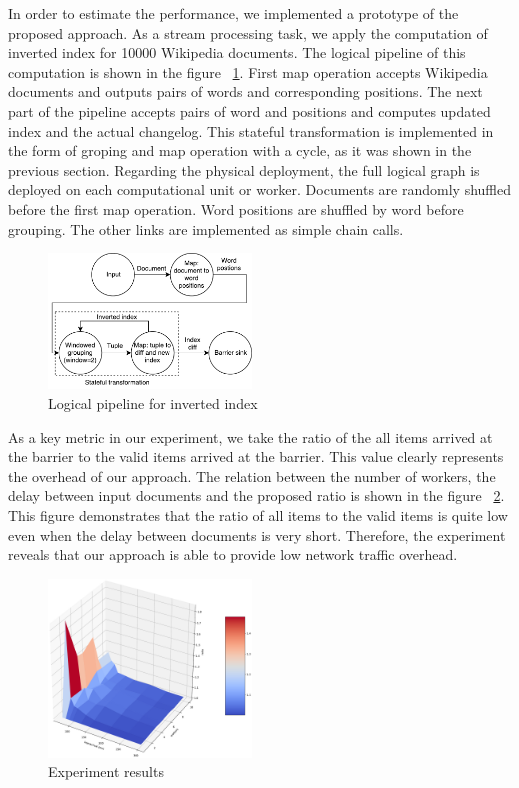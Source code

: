 
\label {fs-experiments}

In order to estimate the performance, we implemented a prototype of the proposed approach. As a stream processing task, we apply the computation of inverted index for 10000 Wikipedia documents. The logical pipeline of this computation is shown in the figure ~\ref{inverted-index}. First map operation accepts Wikipedia documents and outputs pairs of words and corresponding positions. The next part of the pipeline accepts pairs of word and positions and computes updated index and the actual changelog. This stateful transformation is implemented in the form of groping and map operation with a cycle, as it was shown in the previous section. Regarding the physical deployment, the full logical graph is deployed on each computational unit or worker. Documents are randomly shuffled before the first map operation. Word positions are shuffled by word before grouping. The other links are implemented as simple chain calls.

\begin{figure}[htbp]
  \centering
  \includegraphics[width=0.48\textwidth]{pics/inverted-index}
  \caption{Logical pipeline for inverted index}
  \label {inverted-index}
\end{figure}

As a key metric in our experiment, we take the ratio of the all items arrived at the barrier to the valid items arrived at the barrier. This value clearly represents the overhead of our approach. The relation between the number of workers, the delay between input documents and the proposed ratio is shown in the figure ~\ref{experiment}. This figure demonstrates that the ratio of all items to the valid items is quite low even when the delay between documents is very short. Therefore, the experiment reveals that our approach is able to provide low network traffic overhead. 

\begin{figure}[htbp]
  \centering
  \includegraphics[width=0.48\textwidth]{pics/experiment}
  \caption{Experiment results}
  \label {experiment}
\end{figure}